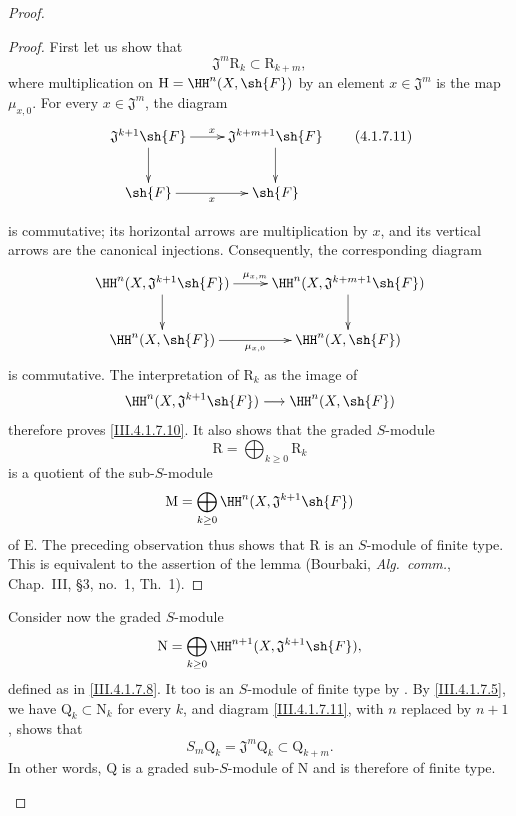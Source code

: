 \begin{proof}
\begin{proof}
First let us show that
\[
  \mathfrak{J}^m\mathrm{R}_k
  \subset
  \mathrm{R}_{k+m},
  \tag{4.1.7.10}
  \label{III.4.1.7.10}
\]
where multiplication on
$\mathrm{H}=\HH^n(X,\sh{F})$ by an element
$x\in\mathfrak{J}^m$ is the map $\mu_{x,0}$.
For every $x\in\mathfrak{J}^m$, the diagram
\[
  \xymatrix{
    \mathfrak{J}^{k+1}\sh{F}
      \ar[r]^{x}\ar[d]
    &
    \mathfrak{J}^{k+m+1}\sh{F}
      \ar[d]
    \\
    \sh{F}
      \ar[r]_{x}
    &
    \sh{F}
  }
  \tag{4.1.7.11}
  \label{III.4.1.7.11}
\]


is commutative; its horizontal arrows are multiplication by $x$, and
its vertical arrows are the canonical injections.
Consequently, the corresponding diagram
\[
  \xymatrix{
    \HH^n(X,\mathfrak{J}^{k+1}\sh{F})
      \ar[r]^{\mu_{x,m}}\ar[d]
    &
    \HH^n(X,\mathfrak{J}^{k+m+1}\sh{F})
      \ar[d]
    \\
    \HH^n(X,\sh{F})
      \ar[r]_{\mu_{x,0}}
    &
    \HH^n(X,\sh{F})
  }
\]
is commutative.
The interpretation of $\mathrm{R}_k$ as the image of
\[
  \HH^n(X,\mathfrak{J}^{k+1}\sh{F})
  \longrightarrow
  \HH^n(X,\sh{F})
\]
therefore proves \eqref{III.4.1.7.10}.
It also shows that the graded $S$-module
\[
  \mathrm{R}=\bigoplus_{k\geq0}\mathrm{R}_k
\]
is a quotient of the sub-$S$-module
\[
  \mathrm{M}
  =
  \bigoplus_{k\geq0}
  \HH^n(X,\mathfrak{J}^{k+1}\sh{F})
\]
of $\mathrm{E}$.
The preceding observation thus shows that $\mathrm{R}$ is an
$S$-module of finite type.
This is equivalent to the assertion of the lemma
(Bourbaki, \emph{Alg.\ comm.}, Chap.~III, \S3, no.~1, Th.~1).
\end{proof}

\begin{env}[4.1.7.12]
\label{III.4.1.7.12}
Consider now the graded $S$-module
\[
  \mathrm{N}
  =
  \bigoplus_{k\geq0}
  \HH^{n+1}(X,\mathfrak{J}^{k+1}\sh{F}),
\]
defined as in \eqref{III.4.1.7.8}.
It too is an $S$-module of finite type by .
By \eqref{III.4.1.7.5}, we have
$\mathrm{Q}_k\subset\mathrm{N}_k$ for every $k$, and diagram
\eqref{III.4.1.7.11}, with $n$ replaced by $n+1$, shows that
\[
  S_m\mathrm{Q}_k
  =
  \mathfrak{J}^m\mathrm{Q}_k
  \subset
  \mathrm{Q}_{k+m}.
\]
In other words, $\mathrm{Q}$ is a graded sub-$S$-module of
$\mathrm{N}$ and is therefore of finite type.
\end{env}


\end{proof}
